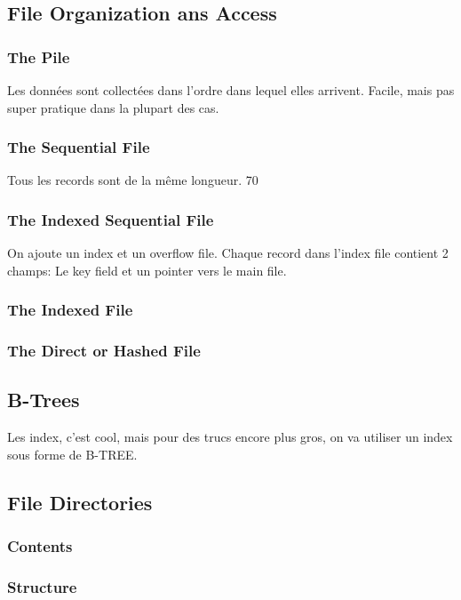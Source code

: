 \subsection{File Organization ans Access }
\subsubsection{The Pile}
Les données sont collectées dans l'ordre dans lequel elles arrivent. Facile, mais pas super pratique dans la plupart des cas.

\subsubsection{The Sequential File}
Tous les records sont de la même longueur. 70

\subsubsection{The Indexed Sequential File}
On ajoute un index et un overflow file. Chaque record dans l'index file contient 2 champs: Le key field et un pointer vers le main file.

\subsubsection{The Indexed File}

\subsubsection{The Direct or Hashed File}

\subsection{B-Trees}
Les index, c'est cool, mais pour des trucs encore plus gros, on va utiliser un index sous forme de B-TREE.

\subsection{File Directories}

\subsubsection{Contents}

\subsubsection{Structure}

